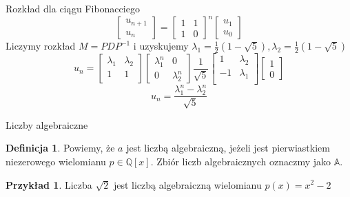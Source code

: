 \documentclass[handout]{beamer}
\def\Q{\mathbb{Q}}
\theoremstyle{definition}
\newtheorem*{definicja}{Definicja}
\newtheorem*{przyklad}{Przykład}
\theoremstyle{named}
\begin{document}
\begin{frame}{Rozkład dla ciągu Fibonacciego}
    \begin{equation*}
        \begin{bmatrix}
        u_{n+1} \\
        u_{n}
        \end{bmatrix}
        = 
        \begin{bmatrix}
        1 & 1\\
        1 & 0
        \end{bmatrix}^n
        \begin{bmatrix}
        u_1 \\
        u_0 
        \end{bmatrix}

    \end{equation*}
    Liczymy rozkład $M = PDP^{-1}$ i uzyskujemy $\lambda_1 =  \frac{1}{2} \left(1-\sqrt{5}\right), \lambda_2 = \frac{1}{2} \left(1-\sqrt{5}\right) $
\begin{equation*}
    u_n = 
        \begin{bmatrix}
            \lambda_1 & \lambda_2 \\
         1 & 1 \\
        \end{bmatrix}
        \begin{bmatrix}
           \lambda_1^{n} & 0 \\
            0 & \lambda_2^{n}
        \end{bmatrix}
        \frac{1}{\sqrt{5}}
        \begin{bmatrix}
           1 & \lambda_2 \\
           -1  & \lambda_1 \\
        \end{bmatrix} 
        \begin{bmatrix}
           1 \\
           0
        \end{bmatrix}
    \end{equation*}
    \begin{equation*}
        u_n = \frac{\lambda_1^{n} - \lambda_2^{n}}{\sqrt{5}}
    \end{equation*}
 
 
\end{frame}

\begin{frame}{Liczby algebraiczne}
\begin{definicja}
    Powiemy, że $a $ jest liczbą algebraiczną, jeżeli jest pierwiastkiem niezerowego wielomianu $p \in \Q[x]$. Zbiór liczb algebraicznych oznaczmy jako $\mathbb{A}$.
\end{definicja}

\begin{przyklad}
    Liczba $\sqrt{2}$ jest liczbą algebraiczną wielomianu $p(x) = x^{2} - 2$
\end{przyklad}

\end{frame}
\end{document}

